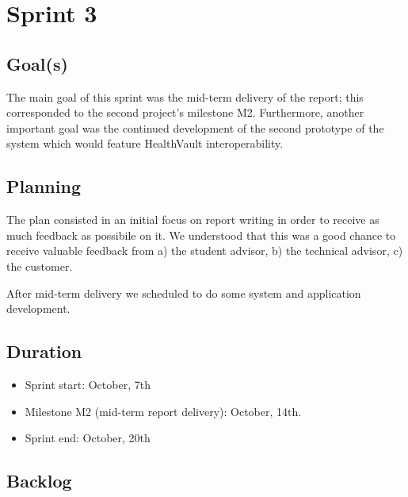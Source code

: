 

\chapter{Sprint 3}
\label{Sprint0}

\section{Goal(s)}

The main goal of this sprint was the mid-term delivery of the report; this corresponded to
the second project's milestone M2. Furthermore, another important goal was the continued development
of the second prototype of the system which would feature HealthVault interoperability.

\section{Planning}

The plan consisted in an initial focus on report writing in order to receive as much
feedback as possibile on it. We understood that this was a good chance to receive
valuable feedback from a) the student advisor, b) the technical advisor, c) the customer.

After mid-term delivery we scheduled to do some system and application development.

\section{Duration}

\begin{itemize}
\item Sprint start:  October, 7th
\item Milestone M2 (mid-term report delivery): October, 14th.
\item Sprint end: October, 20th
\end{itemize}

\section{Backlog}

